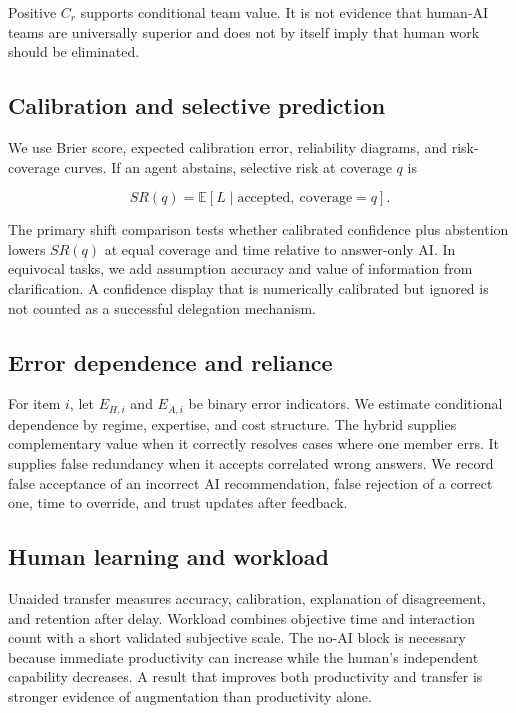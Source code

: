 \documentclass[conference]{IEEEtran}
\begin{document}
Positive $C_r$ supports conditional team value. It is not evidence that human-AI teams are universally superior and does not by itself imply that human work should be eliminated.

\subsection{Calibration and selective prediction}

We use Brier score, expected calibration error, reliability diagrams, and risk-coverage curves. If an agent abstains, selective risk at coverage $q$ is

\begin{equation}
SR(q)=\mathbb{E}[L\mid \text{accepted},\ \mathrm{coverage}=q].
\end{equation}

The primary shift comparison tests whether calibrated confidence plus abstention lowers $SR(q)$ at equal coverage and time relative to answer-only AI. In equivocal tasks, we add assumption accuracy and value of information from clarification. A confidence display that is numerically calibrated but ignored is not counted as a successful delegation mechanism.

\subsection{Error dependence and reliance}

For item $i$, let $E_{H,i}$ and $E_{A,i}$ be binary error indicators. We estimate conditional dependence by regime, expertise, and cost structure. The hybrid supplies complementary value when it correctly resolves cases where one member errs. It supplies false redundancy when it accepts correlated wrong answers. We record false acceptance of an incorrect AI recommendation, false rejection of a correct one, time to override, and trust updates after feedback.

\subsection{Human learning and workload}

Unaided transfer measures accuracy, calibration, explanation of disagreement, and retention after delay. Workload combines objective time and interaction count with a short validated subjective scale. The no-AI block is necessary because immediate productivity can increase while the human's independent capability decreases. A result that improves both productivity and transfer is stronger evidence of augmentation than productivity alone.
\end{document}
